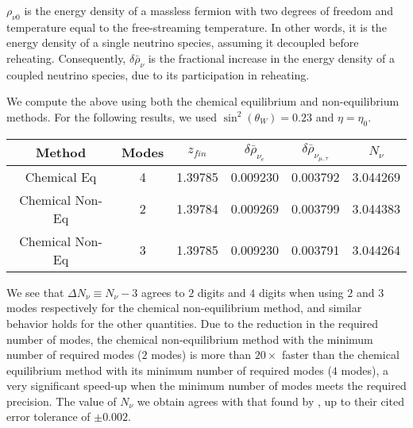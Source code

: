  $\rho_{\nu0}$ is the energy density of a massless fermion with two degrees of freedom and temperature equal to the free-streaming temperature.  In other words, it is the energy density of a single neutrino species, assuming it decoupled before reheating. Consequently, $\delta\bar\rho_\nu$ is the fractional increase in the energy density of a coupled neutrino species, due to its participation in reheating.

We compute the above using both the chemical equilibrium and non-equilibrium methods. For the following results, we used $\sin^2(\theta_W)=0.23$ and $\eta=\eta_0$. 
\begin{table}[ht]\label{table:method_comp}
\centering 
\begin{tabular}{|c|c|c|c|c|c|}
\hline
Method &Modes&$z_{fin}$ & $\delta\bar\rho_{\nu_e}$&   $\delta\bar\rho_{\nu_{\mu,\tau}}$ & $N_{\nu}$  \\
\hline
Chemical Eq& 4 &1.39785 &0.009230 &0.003792 &3.044269\\
\hline
Chemical Non-Eq& 2&1.39784 &0.009269 & 0.003799&3.044383 \\
\hline
Chemical Non-Eq& 3&1.39785&0.009230 & 0.003791&3.044264 \\
\hline
\end{tabular}
\end{table}
We see that $\Delta N_\nu\equiv N_\nu-3$ agrees to $2$ digits and $4$ digits when using $2$ and $3$ modes respectively for the chemical non-equilibrium method, and similar behavior holds for the other quantities. Due to the reduction in the required number of modes, the chemical non-equilibrium method with the minimum number of required modes ($2$ modes) is more than $20\times$ faster than the chemical equilibrium method with its minimum number of required modes ($4$ modes), a very significant speed-up when the minimum number of modes meets the required precision.  The value of $N_\nu$ we obtain agrees with that found by \cite{Mangano2005}, up to their cited error tolerance of $\pm 0.002$.


